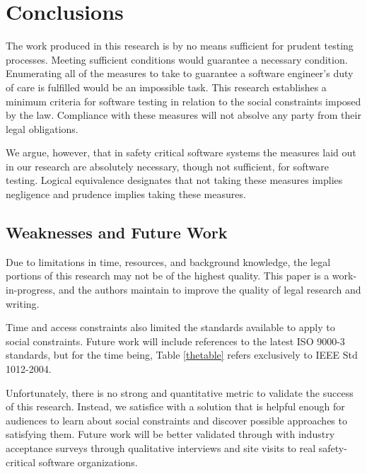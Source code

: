 \chapter{Conclusions}

The work produced in this research is by no means sufficient for prudent testing
processes. Meeting sufficient conditions would guarantee a necessary condition.
Enumerating all of the measures to take to guarantee a software engineer's duty
of care is fulfilled would be an impossible task. This research establishes a
minimum criteria for software testing in relation to the social constraints
imposed by the law. Compliance with these measures will not absolve any party
from their legal obligations.

We argue, however, that in safety critical software systems the measures laid
out in our research are absolutely necessary, though not sufficient, for
software testing. Logical equivalence designates that not taking these
measures implies negligence and prudence implies taking these measures.

\section{Weaknesses and Future Work}
Due to limitations in time, resources, and background knowledge, the legal
portions of this research may not be of the highest quality. This paper is a
work-in-progress, and the authors maintain to improve the quality of legal
research and writing.

Time and access constraints also limited the standards available to apply to
social constraints. Future work will include references to the latest ISO 9000-3
standards, but for the time being, Table \ref{thetable} refers exclusively to
IEEE Std 1012-2004.

Unfortunately, there is no strong and quantitative metric to validate the
success of this research. Instead, we satisfice \cite{Simon96} with a solution
that is helpful enough for audiences to learn about social constraints and
discover possible approaches to satisfying them. Future work will be better
validated through with industry acceptance surveys through qualitative
interviews and site visits to real safety-critical software organizations.
